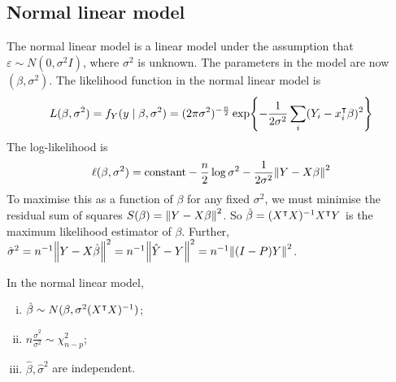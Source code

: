 \subsection{Normal linear model}
The normal linear model is a linear model under the assumption that \( \varepsilon \sim N(0,\sigma^2 I) \), where \( \sigma^2 \) is unknown.
The parameters in the model are now \( (\beta, \sigma^2) \).
The likelihood function in the normal linear model is
\[ L(\beta, \sigma^2) = f_Y(y\mid \beta,\sigma^2) = (2\pi \sigma^2)^{-\frac{n}{2}} \exp{-\frac{1}{2\sigma^2} \sum_i (Y_i - x_i^\intercal\beta)^2} \]
The log-likelihood is
\[ \ell(\beta,\sigma^2) = \text{constant} - \frac{n}{2}\log \sigma^2 - \frac{1}{2\sigma^2} \norm{Y-X\beta}^2 \]
To maximise this as a function of \( \beta \) for any fixed \( \sigma^2 \), we must minimise the residual sum of squares \( S(\beta) = \norm{Y-X\beta}^2 \).
So \( \hat \beta = (X^\intercal X)^{-1} X^\intercal Y \) is the maximum likelihood estimator of \( \beta \).
Further, \( \hat \sigma^2 = n^{-1} \norm{Y-X\hat\beta}^2 = n^{-1} \norm{\hat Y - Y}^2 = n^{-1} \norm{(I-P)Y}^2 \).
\begin{theorem}
	In the normal linear model,
	\begin{enumerate}[(i)]
		\item \( \hat \beta \sim N(\beta,\sigma^2(X^\intercal X)^{-1}) \);
		\item \( n\frac{\hat\sigma^2}{\sigma^2} \sim \chi^2_{n-p} \);
		\item \( \hat \beta, \hat \sigma^2 \) are independent.
	\end{enumerate}
\end{theorem}
